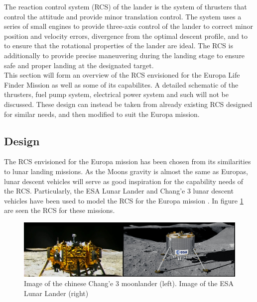 \label{chap:RCS}

The reaction control system (RCS) of the lander is the system of thrusters that control the attitude and provide minor translation control. The system uses a series of small engines to provide three-axis control of the lander to correct minor position and velocity errors, divergence from the optimal descent profile, and to to ensure that the rotational properties of the lander are ideal. The RCS is additionally to provide precise maneuvering during the landing stage to ensure safe and proper landing at the designated target.\\

This section will form an overview of the RCS envisioned for the Europa Life Finder Mission as well as some of its capabilites. A detailed schematic of the thrusters, fuel pump system, electrical power system and such will not be discussed. These design can instead be taken from already existing RCS designed for similar needs, and then modified to suit the Europa mission.

\subsection{Design}

The RCS envisioned for the Europa mission has been chosen from its similarities to lunar landing missions. As the Moons gravity is almost the same as Europas, lunar descent vehicles will serve as good inspiration for the capability needs of the RCS. Particularly, the ESA Lunar Lander and Chang'e 3 lunar descent vehicles have been used to model the RCS for the Europa mission \cite{ESA_pic} \cite{Chang_e_3}. In figure \ref{fig:landers} are seen the RCS for these missions.\\


\begin{figure}[htb]
\begin{center}
\includegraphics[scale=0.19]{figures/RCS/landers}
\caption{Image of the chinese Chang'e 3 moonlander (left). Image of the ESA Lunar Lander (right) \cite{Chang_pic} \cite{ESA_pic}}
\label{fig:landers}
\end{center}
\end{figure}


